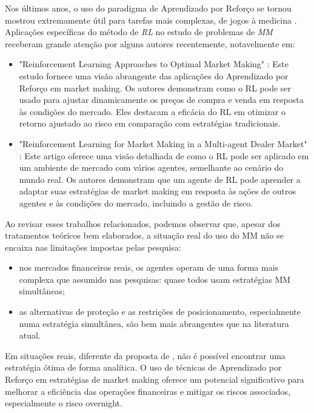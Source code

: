 Nos últimos anos, o uso do paradigma de Aprendizado por Reforço se tornou mostrou extremamente útil para tarefas mais complexas, de jogos à medicina \citep{Kaelbling1996}. 
Aplicações específicas do método de \textit{RL} no estudo de problemas de \textit{MM} receberam grande atenção por alguns autores recentemente, notavelmente em:
\begin{itemize}
    \item "Reinforcement Learning Approaches to Optimal Market Making" \citep{Gasperov2021}: Este estudo fornece uma visão abrangente das aplicações do Aprendizado por Reforço em market making. Os autores demonstram como o RL pode ser usado para ajustar dinamicamente os preços de compra e venda em resposta às condições do mercado. Eles destacam a eficácia do RL em otimizar o retorno ajustado ao risco em comparação com estratégias tradicionais.
    \item "Reinforcement Learning for Market Making in a Multi-agent Dealer Market" \citep{Ganesh2019}: Este artigo oferece uma visão detalhada de como o RL pode ser aplicado em um ambiente de mercado com vários agentes, semelhante ao cenário do mundo real. Os autores demonstram que um agente de RL pode aprender a adaptar suas estratégias de market making em resposta às ações de outros agentes e às condições do mercado, incluindo a gestão de risco.
\end{itemize}


Ao revisar esses trabalhos relacionados, podemos observar que, apesar dos tratamentos teóricos bem elaborados, a situação real do uso do MM não se encaixa nas limitações impostas pelas pesquisa:

\begin{itemize}
    \item nos mercados financeiros reais, os agentes operam de uma forma mais complexa que assumido nas pesquisas: quase todos usam estratégias MM simultâneas;
    \item as alternativas de proteção e as restrições de posicionamento, especialmente numa estratégia simultânea, são bem mais abrangentes que na literatura atual. 
\end{itemize}

Em situações reais, diferente da proposta de \citet{Avellaneda2008}, não é possível encontrar uma estratégia ótima de forma analítica. O uso de técnicas de Aprendizado por Reforço em estratégias de market making oferece um potencial significativo para melhorar a eficiência das operações financeiras e mitigar os riscos associados, especialmente o risco overnight. 

